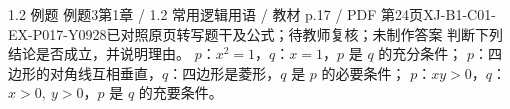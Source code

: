 \par\noindent\begin{minipage}{\linewidth}
\begin{bankitem}{1.2 例题 例题3}{第1章 / 1.2 常用逻辑用语 / 教材 p.17 / PDF 第24页}{XJ-B1-C01-EX-P017-Y0928}{已对照原页转写题干及公式；待教师复核；未制作答案}
判断下列结论是否成立，并说明理由。
$p$：$x^2=1$，$q$：$x=1$，$p$ 是 $q$ 的充分条件；
$p$：四边形的对角线互相垂直，$q$：四边形是菱形，$q$ 是 $p$ 的必要条件；
$p$：$xy>0$，$q$：$x>0,\ y>0$，$p$ 是 $q$ 的充要条件。
\end{bankitem}
\end{minipage}\par\medskip
